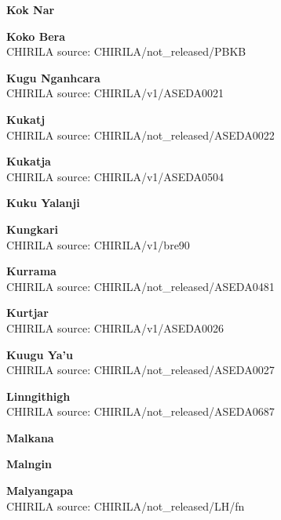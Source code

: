 
\textbf{Kok Nar}\\

\textbf{Koko Bera}\\
CHIRILA source: CHIRILA/not\_released/PBKB


\textbf{Kugu Nganhcara}\\
CHIRILA source: CHIRILA/v1/ASEDA0021


\textbf{Kukatj}\\
CHIRILA source: CHIRILA/not\_released/ASEDA0022


\textbf{Kukatja}\\
CHIRILA source: CHIRILA/v1/ASEDA0504


\textbf{Kuku Yalanji}\\

\textbf{Kungkari}\\
CHIRILA source: CHIRILA/v1/bre90


\textbf{Kurrama}\\
CHIRILA source: CHIRILA/not\_released/ASEDA0481


\textbf{Kurtjar}\\
CHIRILA source: CHIRILA/v1/ASEDA0026


\textbf{Kuugu Ya'u}\\
CHIRILA source: CHIRILA/not\_released/ASEDA0027


\textbf{Linngithigh}\\
CHIRILA source: CHIRILA/not\_released/ASEDA0687


\textbf{Malkana}\\

\textbf{Malngin}\\

\textbf{Malyangapa}\\
CHIRILA source: CHIRILA/not\_released/LH/fn

